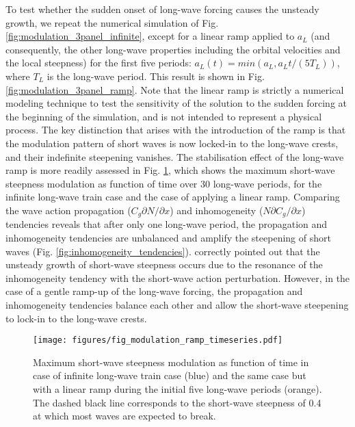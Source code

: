 \documentclass[lineno]{jfm}
\begin{document}
To test whether the sudden onset of long-wave forcing causes the unsteady growth,
we repeat the numerical simulation of Fig.
\ref{fig:modulation_3panel_infinite}, except for a linear ramp applied to $a_L$
(and consequently, the other long-wave properties including the orbital
velocities and the local steepness) for the first five periods:
$a_L(t) = min(a_L, a_L t / \left(5 T_L\right))$, where $T_L$ is the long-wave period.
This result is shown in Fig. \ref{fig:modulation_3panel_ramp}.
Note that the linear ramp is strictly a numerical modeling technique to test
the sensitivity of the solution to the sudden forcing at the beginning of the
simulation, and is not intended to represent a physical process.
The key distinction that arises with the introduction of the ramp is that the
modulation pattern of short waves is now locked-in to the long-wave crests,
and their indefinite steepening vanishes.
The stabilisation effect of the long-wave ramp is more readily assessed in
Fig. \ref{fig:unsteady_growth_timeseries}, which shows the maximum short-wave
steepness modulation as function of time over 30 long-wave periods, for the
infinite long-wave train case and the case of applying a linear ramp.
Comparing the wave action propagation ($C_g \partial N / \partial x$) and
inhomogeneity ($N \partial C_g / \partial x$) tendencies reveals that
after only one long-wave period, the propagation and inhomogeneity tendencies
are unbalanced and amplify the steepening of short waves
(Fig. \ref{fig:inhomogeneity_tendencies}).
\citet{peureux2021unsteady} correctly pointed out that the unsteady growth of
short-wave steepness occurs due to the resonance of the inhomogeneity
tendency with the short-wave action perturbation.
However, in the case of a gentle ramp-up of the long-wave forcing, the
propagation and inhomogeneity tendencies balance each other and allow
the short-wave steepening to lock-in to the long-wave crests.

\begin{figure}
  \centering
  \texttt{[image: figures/fig\_modulation\_ramp\_timeseries.pdf]}
  \caption{
    Maximum short-wave steepness modulation as function of time in case of
    infinite long-wave train case (blue) and the same case but with a linear
    ramp during the initial five long-wave periods (orange). The dashed black
    line corresponds to the short-wave steepness of 0.4 at which most waves are
    expected to break.
  }
  \label{fig:unsteady_growth_timeseries}
\end{figure}
\end{document}
